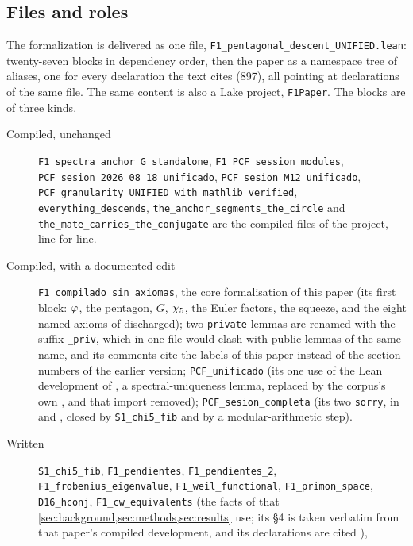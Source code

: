 \subsection{Files and roles}
The formalization is delivered as one file, \texttt{F1\_pentagonal\_descent\_UNIFIED.lean}:
twenty-seven blocks in dependency order, then the paper as a namespace tree of aliases, one for every declaration the text cites (897), all pointing at declarations of the same
file.  The same content is also a Lake project, \texttt{F1Paper}.  The blocks are of
three kinds.
\begin{description}
  \item[Compiled, unchanged] \texttt{F1\_spectra\_anchor\_G\_standalone},
    \texttt{F1\_PCF\_session\_modules}, \texttt{PCF\_sesion\_2026\_08\_18\_unificado},
    \texttt{PCF\_sesion\_M12\_unificado},
    \texttt{PCF\_granularity\_UNIFIED\_with\_mathlib\_verified},
    \texttt{everything\_descends}, \texttt{the\_anchor\_segments\_the\_circle} and
    \texttt{the\_mate\_carries\_the\_conjugate} are the compiled files of the project,
    line for line.
  \item[Compiled, with a documented edit] \texttt{F1\_compilado\_sin\_axiomas}, the
    core formalisation of this paper (its first block: $\varphi$, the pentagon, $G$,
    $\chi_5$, the Euler factors, the squeeze, and the eight named axioms of
    \cite{gonzalez25hp} discharged); two \texttt{private} lemmas are renamed with the
    suffix \texttt{\_priv}, which in one file would clash with public lemmas of the
    same name, and its comments cite the labels of this paper instead of the section
    numbers of the earlier version; \texttt{PCF\_unificado} (its one
    use of the Lean development of \cite{gonzalez26cw}, a spectral-uniqueness lemma,
    replaced by the corpus's own , and that import
    removed); \texttt{PCF\_sesion\_completa} (its two \texttt{sorry}, in
     and
    , closed by \texttt{S1\_chi5\_fib} and by a
    modular-arithmetic step).
  \item[Written] \texttt{S1\_chi5\_fib},
    \texttt{F1\_pendientes}, \texttt{F1\_pendientes\_2}, \texttt{F1\_frobenius\_eigenvalue},
    \texttt{F1\_weil\_functional}, \texttt{F1\_primon\_space}, \texttt{D16\_hconj},
    \texttt{F1\_cw\_equivalents} (the facts of \cite{gonzalez26cw} that \cref{sec:background,sec:methods,sec:results} use;
    its \S4 is taken verbatim from that paper's compiled development, and its declarations are
    cited ),

\end{description}
